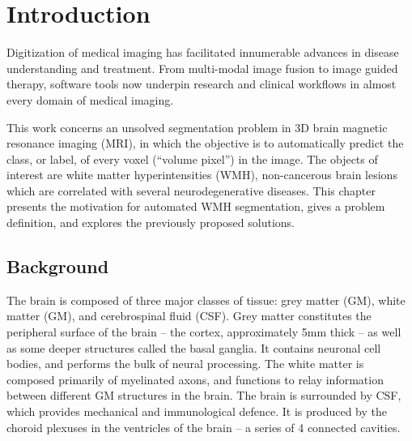 \chapter{Introduction}
Digitization of medical imaging has facilitated innumerable advances in disease understanding and treatment.
From multi-modal image fusion to image guided therapy, software tools now underpin research and clinical workflows in almost every domain of medical imaging.
\par
This work concerns an unsolved segmentation problem in 3D brain magnetic resonance imaging (MRI), in which the objective is to automatically predict the class, or label, of every voxel (``volume pixel'') in the image.
The objects of interest are white matter hyperintensities (WMH), non-cancerous brain lesions which are correlated with several neurodegenerative diseases.
This chapter presents the motivation for automated WMH segmentation, gives a problem definition, and explores the previously proposed solutions.
\section{Background}
The brain is composed of three major classes of tissue: grey matter (GM), white matter (GM), and cerebrospinal fluid (CSF).
Grey matter constitutes the peripheral surface of the brain -- the cortex, approximately 5mm thick -- as well as some deeper structures called the basal ganglia.
It contains neuronal cell bodies, and performs the bulk of neural processing.
The white matter is composed primarily of myelinated axons, and functions to relay information between different GM structures in the brain.
The brain is surrounded by CSF, which provides mechanical and immunological defence.
It is produced by the choroid plexuses in the ventricles of the brain -- a series of 4 connected cavities.
